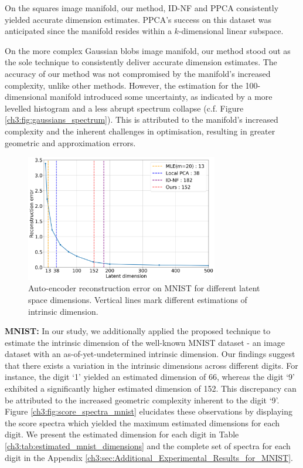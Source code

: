 On the squares image manifold, our method, ID-NF and PPCA consistently yielded accurate dimension estimates. PPCA's success on this dataset was anticipated since the manifold resides within a $k$-dimensional linear subspace.

On the more complex Gaussian blobs image manifold, our method stood out as the sole technique to consistently deliver accurate dimension estimates.  The accuracy of our method was not compromised by the manifold's increased complexity, unlike other methods. However, the estimation for the 100-dimensional manifold introduced some uncertainty, as indicated by a more levelled histogram and a less abrupt spectrum collapse (c.f. Figure \ref{ch3:fig:gaussians_spectrum}). This is attributed to the manifold's increased complexity and the inherent challenges in optimisation, resulting in greater geometric and approximation errors.

\begin{figure}
    \begin{center}
        \includegraphics[width=0.75\textwidth]{Chapter3/figures/mnist_autoencoder.png}
        \caption{Auto-encoder reconstruction error on MNIST for different latent space dimensions. Vertical lines mark different estimations of intrinsic dimension.}
        \label{ch3:fig:mnist_autoencoder}
    \end{center}
\end{figure}


\textbf{MNIST:} In our study, we additionally applied the proposed technique to estimate the intrinsic dimension of the well-known MNIST dataset - an image dataset with an as-of-yet-undetermined intrinsic dimension. Our findings suggest that there exists a variation in the intrinsic dimensions across different digits. For instance, the digit `1' yielded an estimated dimension of 66, whereas the digit `9' exhibited a significantly higher estimated dimension of 152. This discrepancy can be attributed to the increased geometric complexity inherent to the digit `9'. Figure \ref{ch3:fig:score_spectra_mnist} elucidates these observations by displaying the score spectra which yielded the maximum estimated dimensions for each digit. We present the estimated dimension for each digit in Table \ref{ch3:tab:estimated_mnist_dimensions} and the complete set of spectra for each digit in the Appendix \ref{ch3:sec:Additional_Experimental_Results_for_MNIST}. 

